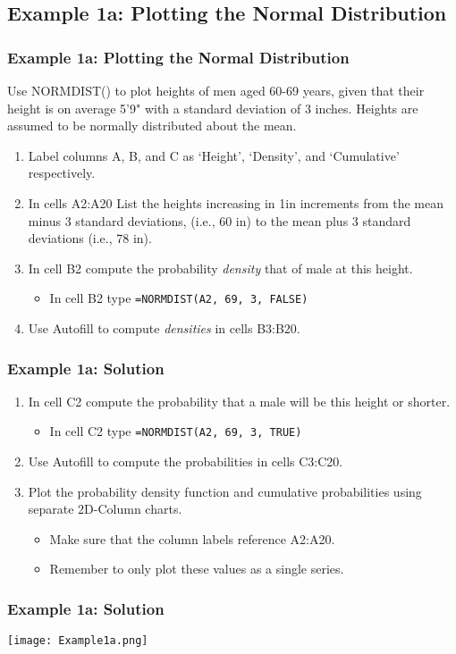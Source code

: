 \documentclass[12pt]{beamer}
\begin{document}
\subsection{Example 1a: Plotting the Normal Distribution}
	\begin{frame}
		\frametitle{Example 1a: Plotting the Normal Distribution}
		Use NORMDIST() to plot heights of men aged 60-69 years, given that their height is on average 5'9" with a standard deviation of 3 inches. Heights are assumed to be normally distributed about the mean. 
		\begin{enumerate}
			\item Label columns A, B, and C as `Height', `Density', and `Cumulative' respectively.  
			\item In cells A2:A20 List the heights increasing in 1in increments from the mean minus 3 standard deviations, (i.e., 60 in) to the mean plus 3 standard deviations (i.e., 78 in).
			\item In cell B2 compute the probability \textit{density} that of male at this height.
			\begin{itemize}
				\item In cell B2 type \texttt{=NORMDIST(A2, 69, 3, FALSE)}
			\end{itemize}
			\item Use Autofill to compute \textit{densities} in cells B3:B20.
		\end{enumerate}
	\end{frame}
	\begin{frame}
		\frametitle{Example 1a: Solution}
		\begin{enumerate}
			\item In cell C2 compute the probability that a male will be this height or shorter. 
			\begin{itemize}
				\item In cell C2 type \texttt{=NORMDIST(A2, 69, 3, TRUE)}
			\end{itemize}
			\item Use Autofill to compute the probabilities in cells C3:C20.
			\item Plot the probability density function and cumulative probabilities using separate 2D-Column charts. 
			\begin{itemize}
				\item Make sure that the column labels reference A2:A20.
				\item Remember to only plot these values as a single series.
			\end{itemize}
		\end{enumerate}
	\end{frame}
	\begin{frame}
		\frametitle{Example 1a: Solution}
		\begin{center}
			\texttt{[image: Example1a.png]}
		\end{center}
	
	\end{frame}
\end{document}
